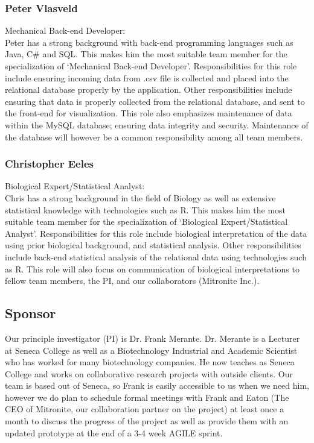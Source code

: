 \documentclass[10pt,twocolumn,letterpaper]{article}
\begin{document}
                \subsubsection*{Peter Vlasveld}

                Mechanical Back-end Developer:\\

		Peter has a strong background with back-end programming languages such as Java, C\# and SQL.
		This makes him the most suitable team member for the specialization of `Mechanical Back-end Developer'.
		Responsibilities for this role include ensuring incoming data from .csv file is collected and placed into 
		the relational database properly by the application.
		Other responsibilities include ensuring that data is properly collected from the relational database, and sent to the front-end for visualization.
		This role also emphasizes maintenance of data within the MySQL database; ensuring data integrity and security.
		Maintenance of the database will however be a common responsibility among all team members.

                \subsubsection*{Christopher Eeles}

                Biological Expert/Statistical Analyst:\\
		
		Chris has a strong background in the field of Biology as well as extensive statistical knowledge with technologies such as R.
		This makes him the most suitable team member for the specialization of `Biological Expert/Statistical Analyst'.
		Responsibilities for this role include biological interpretation of the data using prior biological background, and statistical analysis.
		Other responsibilities include back-end statistical analysis of the relational data using technologies such as R.
		This role will also focus on communication of biological interpretations to fellow team members, the PI, and our collaborators (Mitronite Inc.).	
		

        \subsection{Sponsor}

	Our principle investigator (PI) is Dr. Frank Merante. 
	Dr. Merante is a Lecturer at Seneca College as well as a Biotechnology Industrial and Academic Scientist who has worked for many biotechnology companies.
	He now teaches as Seneca College and works on collaborative research projects with outside clients. 
	Our team is based out of Seneca, so Frank is easily accessible to us when we need him, however we do plan to schedule formal meetings with Frank and Eaton (The CEO of
	Mitronite, our collaboration partner on the project) at least once a month to discuss the progress of the project as well as provide them with an updated prototype at the
	end of a 3-4 week AGILE sprint.
		
\end{document}
